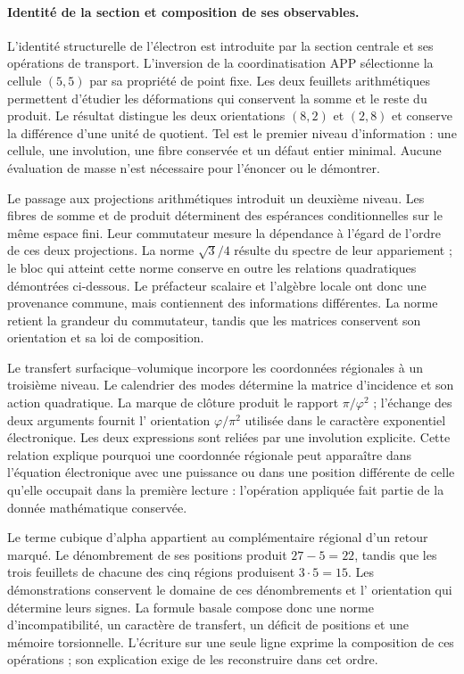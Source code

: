 \paragraph{Identité de la section et composition de ses observables.}
\label{el-ampl-articulacion}
L'identité structurelle de l'électron est introduite par la section
centrale et ses opérations de transport. L'inversion de la coordinatisation APP
sélectionne la cellule $(5,5)$ par sa propriété de point fixe. Les deux feuillets
arithmétiques permettent d'étudier les déformations qui conservent la somme et
le reste du produit. Le résultat distingue les deux orientations
$(8,2)$ et $(2,8)$ et conserve la différence d'une unité de quotient.
Tel est le premier niveau d'information : une cellule, une involution, une
fibre conservée et un défaut entier minimal. Aucune évaluation de masse
n'est nécessaire pour l'énoncer ou le démontrer.

Le passage aux projections arithmétiques introduit un deuxième niveau. Les
fibres de somme et de produit déterminent des espérances conditionnelles sur le
même espace fini. Leur commutateur mesure la dépendance à l'égard de
l'ordre de ces deux projections. La norme $\sqrt3/4$ résulte du spectre
de leur appariement ; le bloc qui atteint cette norme conserve en outre
les relations quadratiques démontrées ci-dessous. Le
préfacteur scalaire et l'algèbre locale ont donc une provenance commune, mais
contiennent des informations différentes. La norme retient la grandeur du
commutateur, tandis que les matrices conservent son orientation et sa loi de
composition.

Le transfert surfacique--volumique incorpore les coordonnées régionales
à un troisième niveau. Le calendrier des modes détermine la matrice
d'incidence et son action quadratique. La marque de clôture produit le rapport
$\pi/\varphi^2$ ; l'échange des deux arguments fournit l'
orientation $\varphi/\pi^2$ utilisée dans le caractère exponentiel
électronique. Les deux expressions sont reliées par une involution
explicite. Cette relation explique pourquoi une coordonnée régionale peut
apparaître dans l'équation électronique avec une puissance ou dans une position
différente de celle qu'elle occupait dans la première lecture : l'opération appliquée
fait partie de la donnée mathématique conservée.

Le terme cubique d'alpha appartient au complémentaire régional d'un retour
marqué. Le dénombrement de ses positions produit $27-5=22$, tandis que les
trois feuillets de chacune des cinq régions produisent $3\cdot5=15$.
Les démonstrations conservent le domaine de ces dénombrements et l'
orientation qui détermine leurs signes. La formule basale compose
donc une norme d'incompatibilité, un caractère de
transfert, un déficit de positions et une mémoire torsionnelle.
L'écriture sur une seule ligne exprime la composition de ces
opérations ; son explication exige de les reconstruire dans cet ordre.

